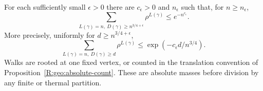 \begin{proposition}\label{R:geo:fast}
For each sufficiently small $\epsilon>0$ there are $c_\epsilon>0$ and
$n_\epsilon$ such that, for $n\ge n_\epsilon$,
\begin{equation}\label{R:geo:fast-absolute}
 \sum_{L(\gamma)=n,\ D(\gamma)\ge n^{3/4+\epsilon}}
                  \rho^{L(\gamma)}\le e^{-n^{c_\epsilon}}.
\end{equation}
More precisely, uniformly for $d\ge n^{3/4+\epsilon}$,
\begin{equation}\label{R:geo:fast-refined}
 \sum_{L(\gamma)=n,\ D(\gamma)\ge d}\rho^{L(\gamma)}
                  \le \exp(-c_\epsilon d/n^{3/4}).
\end{equation}
Walks are rooted at one fixed vertex, or counted in the translation
convention of Proposition~\ref{R:geo:absolute-count}.  These are
absolute masses before division by any finite or thermal partition.
\end{proposition}
